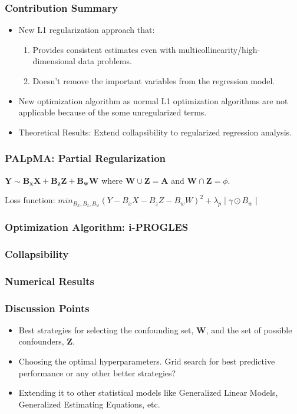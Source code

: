 \documentclass{beamer}
\begin{document}
\begin{frame}
	\frametitle{Contribution Summary}
	\begin{itemize}
		\item New L1 regularization approach that:
			\begin{enumerate}
				\item Provides consistent estimates even with
					multicollinearity/high-dimensional data
					problems.
				\item Doesn't remove the important variables
					from the regression model.
			\end{enumerate}
		\item New optimization algorithm as normal L1 optimization algorithms are not applicable because of the some unregularized terms.
		\item Theoretical Results: Extend collapsibility to regularized regression analysis.
	\end{itemize}
\end{frame}

\begin{frame}
	\frametitle{PALpMA: Partial Regularization}
	$ \bm{Y} \sim \bm{B_x X} + \bm{B_z Z} + \bm{B_w W} $ where $ \bm{W} \cup \bm{Z} = \bm{A} $ and $ \bm{W} \cap \bm{Z} = \phi $.
	
	Loss function: $ min_{B_x, B_z, B_w} (Y - B_x X - B_z Z - B_w W)^2 + \lambda_p \mid \gamma \odot B_w \mid $

\end{frame}

\begin{frame}
	\frametitle{Optimization Algorithm: i-PROGLES}
\end{frame}

\begin{frame}
	\frametitle{Collapsibility}
\end{frame}

\begin{frame}
	\frametitle{Numerical Results}
\end{frame}

\begin{frame}
	\frametitle{Discussion Points}
	\begin{itemize}
		\item Best strategies for selecting the confounding set, $
			\bm{W} $, and the set of possible confounders, $ \bm{Z} $.
		\item Choosing the optimal hyperparameters. Grid search for best 
			predictive performance or any other better strategies?
		\item Extending it to other statistical models like Generalized
			Linear Models, Generalized Estimating Equations, etc.
	\end{itemize}
\end{frame}
\end{document}
